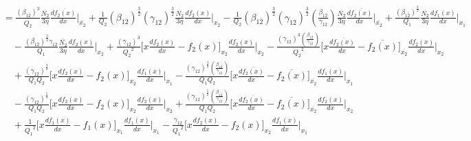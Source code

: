 \documentclass[fleqn, 10pt]{article}
\begin{document}
            \begin{equation*}
            \begin{split}
            &=   \frac{(\beta_{1\overline{2}})^3}{\overline{Q_2}} \frac{\overline{N_2}}{3 \eta} \frac{d\overline{f_2(x)}}{dx} \Bigg|_{\overline{x_2}} +  \frac{1}{Q_2} (\beta_{1\overline{2}})^\frac{3}{2} (\gamma_{12})^\frac{3}{2} \frac{\overline{N_2}}{3 \eta} \frac{df_2(x)}{dx} \Bigg|_{x_2} - \frac{1}{Q_2} (\beta_{1\overline{2}})^\frac{3}{2} (\gamma_{12})^\frac{3}{2}  \left(\frac{\beta_{1\overline{2}}}{\gamma_{12}}\right) \frac{\overline{N_2}}{3 \eta} \frac{d\overline{f_2(x)}}{dx} \Bigg|_{\overline{x_2}} +   \frac{(\beta_{1\overline{2}})^\frac{3}{2}}{Q_1} \frac{\overline{N_2}}{3 \eta} \frac{df_1(x)}{dx} \Bigg|_{x_1} \\ & \quad -     \frac{(\beta_{1\overline{2}})^\frac{3}{2} \gamma_{12}}{Q_1} \frac{\overline{N_2}}{3 \eta} \frac{df_2(x)}{dx} \Bigg|_{x_2}  + \frac{(\gamma_{12})^3}{{Q_2}^2} \biggl[ x\frac{df_2(x)}{dx} - f_2(x) \biggr]_{x_2} \frac{df_2(x)}{dx} \Bigg|_{x_2} - \frac{(\gamma_{12})^3 \left(\frac{\beta_{1\overline{2}}}{\gamma_{12}}\right)}{{Q_2}^2} \biggl[ x \frac{d\overline{f_2(x)}}{dx} -   \overline{f_2(x)} \biggr]_{\overline{x_2}} \frac{df_2(x)}{dx} \Bigg|_{x_2} \\ & \quad +   \frac{(\gamma_{12})^\frac{3}{2}}{Q_1 Q_2} \biggl[x \frac{df_2(x)}{dx} - f_2(x) \biggr]_{x_2} \frac{df_1(x)}{dx} \Bigg|_{x_1} - \frac{(\gamma_{12})^\frac{3}{2}  \left(\frac{\beta_{1\overline{2}}}{\gamma_{12}}\right)}{Q_1 Q_2} \biggl[ x \frac{d\overline{f_2(x)}}{dx} -  \overline{f_2(x)} \biggr]_{\overline{x_2}} \frac{df_1(x)}{dx} \Bigg|_{x_1} \\ & \quad -     \frac{(\gamma_{12})^\frac{5}{2}}{Q_1 Q_2} \biggl[ x \frac{df_2(x)}{dx} - f_2(x) \biggr]_{x_2} \frac{df_2(x)}{dx} \Bigg|_{x_2} + \frac{(\gamma_{12})^\frac{5}{2}  \left(\frac{\beta_{1\overline{2}}}{\gamma_{12}}\right)}{Q_1 Q_2} \biggl[ x\frac{d \overline{f_2(x)}}{dx} -   \overline{f_2(x)} \biggr]_{\overline{x_2}} \frac{df_2(x)}{dx} \Bigg|_{x_2} \\ & \quad + \frac{1}{{Q_1}^2} \biggl[ x \frac{df_1(x)}{dx} - f_1(x) \biggr]_{x_1} \frac{df_1(x)}{dx} \Bigg|_{x_1}  - \frac{\gamma_{12}}{{Q_1}^2} \biggl[ x \frac{df_2(x)}{dx} -  f_2(x) \biggr]_{x_2} \frac{df_1(x)}{dx} \Bigg|_{x_1} 
            \end{split}
            \end{equation*}
\end{document}
